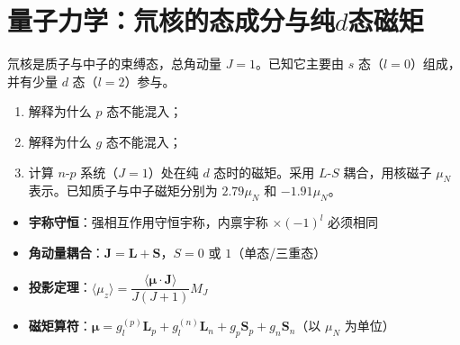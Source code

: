 \section{量子力学：氘核的态成分与纯\texorpdfstring{$d$}{d}态磁矩}
\label{sec:deuteron-pg-magnetic}

\begin{modelbox}
氘核是质子与中子的束缚态，总角动量 $J=1$。已知它主要由 $s$ 态（$l=0$）组成，并有少量 $d$ 态（$l=2$）参与。
\begin{enumerate}
    \item 解释为什么 $p$ 态不能混入；
    \item 解释为什么 $g$ 态不能混入；
    \item 计算 $n$-$p$ 系统（$J=1$）处在纯 $d$ 态时的磁矩。采用 $L$-$S$ 耦合，用核磁子 $\mu_N$ 表示。已知质子与中子磁矩分别为 $2.79\mu_N$ 和 $-1.91\mu_N$。
\end{enumerate}
\end{modelbox}

\begin{tipbox}[考点快速分析]
\begin{itemize}
    \item \textbf{宇称守恒}：强相互作用守恒宇称，内禀宇称 $\times(-1)^l$ 必须相同
    \item \textbf{角动量耦合}：$\mathbf{J}=\mathbf{L}+\mathbf{S}$，$S=0$ 或 $1$（单态/三重态）
    \item \textbf{投影定理}：$\langle\mu_z\rangle=\dfrac{\langle\boldsymbol\mu\cdot\mathbf{J}\rangle}{J(J+1)}M_J$
    \item \textbf{磁矩算符}：$\boldsymbol\mu=g_l^{(p)}\mathbf{L}_p+g_l^{(n)}\mathbf{L}_n+g_p\mathbf{S}_p+g_n\mathbf{S}_n$（以 $\mu_N$ 为单位）
\end{itemize}
\end{tipbox}

